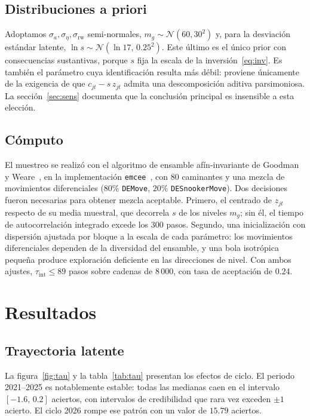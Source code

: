 \documentclass[aps,prd,reprint,amsmath,amssymb,nofootinbib,superscriptaddress]{revtex4-2}
\begin{document}
\subsection{Distribuciones a priori}

Adoptamos $\sigma_a,\sigma_\eta,\sigma_{\mathrm{rw}}$ semi-normales,
$m_g\sim\mathcal{N}(60,30^{2})$ y, para la desviaci\'on est\'andar
latente, $\ln s\sim\mathcal{N}(\ln 17,\,0.25^{2})$. Este \'ultimo es el
\'unico prior con consecuencias sustantivas, porque $s$ fija la escala de
la inversi\'on~\eqref{eq:inv}. Es tambi\'en el par\'ametro cuya
identificaci\'on resulta m\'as d\'ebil: proviene \'unicamente de la
exigencia de que $c_{jt}-s\,z_{jt}$ admita una descomposici\'on aditiva
parsimoniosa. La secci\'on~\ref{sec:sens} documenta que la conclusi\'on
principal es insensible a esta elecci\'on.

\subsection{C\'omputo}

El muestreo se realiz\'o con el algoritmo de ensamble af\'in-invariante de
Goodman y Weare~\cite{goodman2010}, en la implementaci\'on
\texttt{emcee}~\cite{foremanmackey2013}, con 80 caminantes y una mezcla de
movimientos diferenciales ($80\%$ \texttt{DEMove}, $20\%$
\texttt{DESnookerMove}). Dos decisiones fueron necesarias para obtener
mezcla aceptable. Primero, el centrado de $z_{jt}$ respecto de su media
muestral, que decorrela $s$ de los niveles $m_g$; sin \'el, el tiempo de
autocorrelaci\'on integrado excede los 300 pasos. Segundo, una
inicializaci\'on con dispersi\'on ajustada por bloque a la escala de cada
par\'ametro: los movimientos diferenciales dependen de la diversidad del
ensamble, y una bola isotr\'opica peque\~na produce exploraci\'on
deficiente en las direcciones de nivel. Con ambos ajustes,
$\tau_{\mathrm{int}}\le 89$ pasos sobre cadenas de 8\,000, con tasa de
aceptaci\'on de $0.24$.

\section{Resultados}\label{sec:resultados}

\subsection{Trayectoria latente}

La figura~\ref{fig:tau} y la tabla~\ref{tab:tau} presentan los efectos de
ciclo. El periodo 2021--2025 es notablemente estable: todas las medianas
caen en el intervalo $[-1.6,\,0.2]$ aciertos, con intervalos de
credibilidad que rara vez exceden $\pm 1$ acierto. El ciclo 2026 rompe ese
patr\'on con un valor de $15.79$ aciertos.
\end{document}
